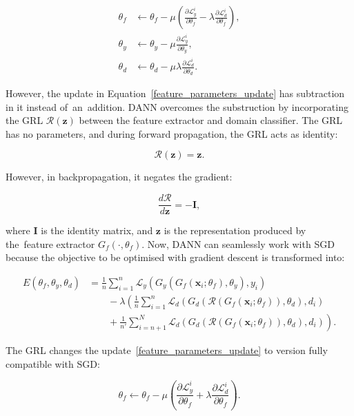 \begin{align}
	\theta_f &\gets \theta_f - \mu \left(
	\frac{\partial \mathcal{L}_y^i}{\partial \theta_f}
	- \lambda \frac{\partial \mathcal{L}_d^i}{\partial \theta_f}
	\right),
	\label{feature_parameters_update} \\
	\theta_y &\gets \theta_y - \mu
	\frac{\partial \mathcal{L}_y^i}{\partial \theta_y}, \\
	\theta_d &\gets \theta_d - \mu \lambda
	\frac{\partial \mathcal{L}_d^i}{\partial \theta_d}.
\end{align}

However, the update in Equation~\ref{feature_parameters_update} has subtraction in it instead of~an~addition.
DANN overcomes the substruction by incorporating the GRL \(\mathcal{R}(\mathbf{z})\) between the feature extractor and domain classifier.
The GRL has no parameters, and during forward propagation, the GRL acts as identity:

\begin{equation}
	\mathcal{R}(\mathbf{z}) = \mathbf{z}.
\end{equation}

However, in backpropagation, it negates the gradient:

\begin{equation}
	\frac{d \mathcal{R}}{d \mathbf{z}} = -\mathbf{I},
\end{equation}

where \(\mathbf{I}\) is the identity matrix,
and \(\mathbf{z}\) is the representation produced by the~feature extractor
\(G_f(\cdot, \theta_f)\).
Now, DANN can seamlessly work with SGD
because the objective to be optimised with gradient descent is transformed into:

\begin{align}
	E(\theta_f, \theta_y, \theta_d) &= \frac{1}{n} \sum^{n}_{i = 1} \mathcal{L}_y(G_y(G_f(\mathbf{x}_i; \theta_f), \theta_y), y_i) \nonumber \\
	&\qquad {} - \lambda \left(\frac{1}{n} \sum^{n}_{i = 1} \mathcal{L}_d(G_d(\mathcal{R}(G_f(\mathbf{x}_i; \theta_f)), \theta_d), d_i) \right. \nonumber \\
	&\qquad \left. {} + \frac{1}{n'} \sum^{N}_{i = n + 1} \mathcal{L}_d(G_d(\mathcal{R}(G_f(\mathbf{x}_i; \theta_f)), \theta_d), d_i)\right).
	\label{dann_loss}
\end{align}

The GRL changes the update~\ref{feature_parameters_update}
to version fully compatible with SGD:

\begin{equation}
	\theta_f \gets \theta_f - \mu \left(
	\frac{\partial \mathcal{L}_y^i}{\partial \theta_f}
	+ \lambda \frac{\partial \mathcal{L}_d^i}{\partial \theta_f}
	\right).
\end{equation}

